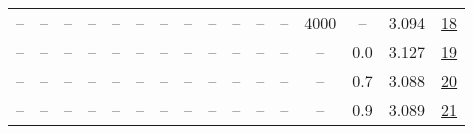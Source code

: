 \begin{table}[H]
\begin{tabular}{cccccccccccccccc}
-- & -- & -- & -- & -- & -- & -- & -- & -- & -- & -- & -- & 4000 & -- & 3.094 & \href{https://wandb.ai/stanford-mercury/optimizer-scaling/runs/sweep-520m-10B-krona25d57lr0.001-wd0.5-b10.95-plr0.2-pis1-gn1-no-c8cf50}{18} \\
-- & -- & -- & -- & -- & -- & -- & -- & -- & -- & -- & -- & -- & 0.0 & 3.127 & \href{https://wandb.ai/stanford-mercury/optimizer-scaling/runs/sweep-520m-10B-kronb94006lr0.001-wd0.0-b10.95-plr0.2-pis1-gn1-no-00711c}{19} \\
-- & -- & -- & -- & -- & -- & -- & -- & -- & -- & -- & -- & -- & 0.7 & 3.088 & \href{https://wandb.ai/stanford-mercury/optimizer-scaling/runs/sweep-520m-10B-kron80f4e9lr0.001-wd0.7-b10.95-plr0.2-pis1-gn1-no-a97c93}{20} \\
-- & -- & -- & -- & -- & -- & -- & -- & -- & -- & -- & -- & -- & 0.9 & 3.089 & \href{https://wandb.ai/stanford-mercury/optimizer-scaling/runs/sweep-520m-10B-krona7c046lr0.001-wd0.9-b10.95-plr0.2-pis1-gn1-no-e1f440}{21} \\
\bottomrule
\end{tabular}
\end{table}

